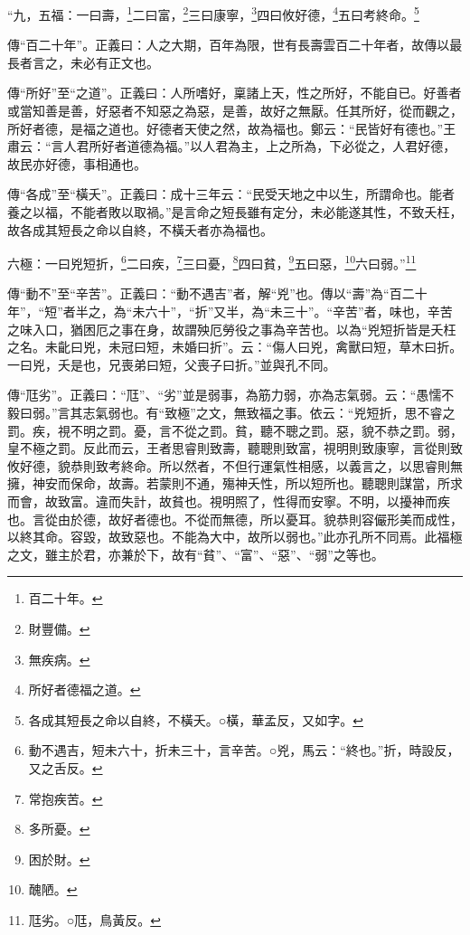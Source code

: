 “九，五福：一曰壽，\footnote{百二十年。}二曰富，\footnote{財豐備。}三曰康寧，\footnote{無疾病。}四曰攸好德，\footnote{所好者德福之道。}五曰考終命。\footnote{各成其短長之命以自終，不橫夭。○橫，華孟反，又如字。}


{\noindent\zhuan{}\fzbyks 傳“百二十年”。正義曰：人之大期，百年為限，世有長壽雲百二十年者，故傳以最長者言之，未必有正文也。 \par}

{\noindent\zhuan{}\fzbyks 傳“所好”至“之道”。正義曰：人所嗜好，稟諸上天，性之所好，不能自已。好善者或當知善是善，好惡者不知惡之為惡，是善，故好之無厭。任其所好，從而觀之，所好者德，是福之道也。好德者天使之然，故為福也。鄭云：“民皆好有德也。”王肅云：“言人君所好者道德為福。”以人君為主，上之所為，下必從之，人君好德，故民亦好德，事相通也。 \par}

{\noindent\zhuan{}\fzbyks 傳“各成”至“橫夭”。正義曰：成十三年云：“民受天地之中以生，所謂命也。能者養之以福，不能者敗以取禍。”是言命之短長雖有定分，未必能遂其性，不致夭枉，故各成其短長之命以自終，不橫夭者亦為福也。 \par}

六極：一曰兇短折，\footnote{動不遇吉，短未六十，折未三十，言辛苦。○兇，馬云：“終也。”折，時設反，又之舌反。}二曰疾，\footnote{常抱疾苦。}三曰憂，\footnote{多所憂。}四曰貧，\footnote{困於財。}五曰惡，\footnote{醜陋。}六曰弱。”\footnote{尫劣。○尫，鳥黃反。}

{\noindent\zhuan{}\fzbyks 傳“動不”至“辛苦”。正義曰：“動不遇吉”者，解“兇”也。傳以“壽”為“百二十年”，“短”者半之，為“未六十”，“折”又半，為“未三十”。“辛苦”者，味也，辛苦之味入口，猶困厄之事在身，故謂殃厄勞役之事為辛苦也。以為“兇短折皆是夭枉之名。未齔曰兇，未冠曰短，未婚曰折”。云：“傷人曰兇，禽獸曰短，草木曰折。一曰兇，夭是也，兄喪弟曰短，父喪子曰折。”並與孔不同。 \par}

{\noindent\zhuan{}\fzbyks 傳“尫劣”。正義曰：“尫”、“劣”並是弱事，為筋力弱，亦為志氣弱。云：“愚懦不毅曰弱。”言其志氣弱也。有“致極”之文，無致福之事。依云：“兇短折，思不睿之罰。疾，視不明之罰。憂，言不從之罰。貧，聽不聰之罰。惡，貌不恭之罰。弱，皇不極之罰。反此而云，王者思睿則致壽，聽聰則致富，視明則致康寧，言從則致攸好德，貌恭則致考終命。所以然者，不但行運氣性相感，以義言之，以思睿則無擁，神安而保命，故壽。若蒙則不通，殤神夭性，所以短所也。聽聰則謀當，所求而會，故致富。違而失計，故貧也。視明照了，性得而安寧。不明，以擾神而疾也。言從由於德，故好者德也。不從而無德，所以憂耳。貌恭則容儼形美而成性，以終其命。容毀，故致惡也。不能為大中，故所以弱也。”此亦孔所不同焉。此福極之文，雖主於君，亦兼於下，故有“貧”、“富”、“惡”、“弱”之等也。 \par}

